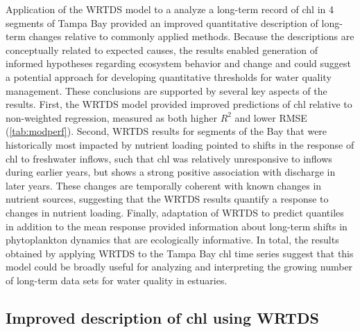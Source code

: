 \documentclass{svjour3}\usepackage[]{graphicx}\usepackage[]{color}
\begin{document}
Application of the \acf{WRTDS} model to a analyze a long-term record of \ac{chl} in 4 segments of Tampa Bay provided an improved quantitative description of long-term changes relative to commonly applied methods.  Because the descriptions are conceptually related to expected causes, the results enabled generation of informed hypotheses regarding ecosystem behavior and change and could suggest a potential approach for developing quantitative thresholds for water quality management.   These conclusions are supported by several key aspects of the results.  First, the \ac{WRTDS} model provided improved predictions of \ac{chl} relative to non-weighted regression, measured as both higher $R^2$ and lower \ac{RMSE} (\cref{tab:modperf}).  Second, \ac{WRTDS} results for segments of the Bay that were historically most impacted by nutrient loading pointed to shifts in the response of \ac{chl} to freshwater inflows, such that \ac{chl} was relatively unresponsive to inflows during earlier years, but shows a strong positive association with discharge in later years.  These changes are temporally coherent with known changes in nutrient sources, suggesting that the \ac{WRTDS} results quantify a response to changes in nutrient loading.  Finally, adaptation of \ac{WRTDS} to predict quantiles in addition to the mean response provided information about long-term shifts in phytoplankton dynamics that are ecologically informative.  In total, the results obtained by applying \ac{WRTDS} to the Tampa Bay \ac{chl} time series suggest that this model could be broadly useful for analyzing and interpreting the growing number of long-term data sets for water quality in estuaries.

\subsection{Improved description of \ac{chl} using \ac{WRTDS}}
\end{document}
